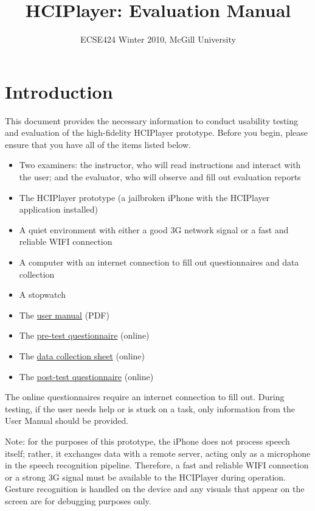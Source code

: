 \documentclass[12pt,letterpaper]{article}
\begin{document}
\title{HCIPlayer: Evaluation Manual}
\author{ECSE424 Winter 2010, McGill University}
\renewcommand{\today}{Updated: Monday, March 8th, 2010}
\maketitle

\section{Introduction}

This document provides the necessary information to conduct usability testing and evaluation of the high-fidelity HCIPlayer prototype. Before you begin, please ensure that you have all of the items listed below.

\begin{itemize}
\item Two examiners: the instructor, who will read instructions and interact with the user; and the evaluator, who will observe and fill out evaluation reports
\item The HCIPlayer prototype (a jailbroken iPhone with the HCIPlayer application installed)
\item A quiet environment with either a good 3G network signal or a fast and reliable WIFI connection
\item A computer with an internet connection to fill out questionnaires and data collection
\item A stopwatch
\item The \href{http://www.ece.mcgill.ca/~scormi3/hci/docs/user-manual.pdf}{user manual} (PDF)
\item The \href{http://fluidsurveys.com/s/hciplayer-pretest/}{pre-test questionnaire} (online)
\item The \href{http://fluidsurveys.com/s/hciplayer-datacollectionsheet/}{data collection sheet} (online)
\item The \href{http://fluidsurveys.com/s/hciplayer-posttest/}{post-test questionnaire} (online)
\end{itemize}

The online questionnaires require an internet connection to fill out. During testing, if the user needs help or is stuck on a task, only information from the User Manual should be provided.

Note: for the purposes of this prototype, the iPhone does not process speech itself; rather, it exchanges data with a remote server, acting only as a microphone in the speech recognition pipeline. Therefore, a fast and reliable WIFI connection or a strong 3G signal must be available to the HCIPlayer during operation. Gesture recognition is handled on the device and any visuals that appear on the screen are for debugging purposes only.
\end{document}
